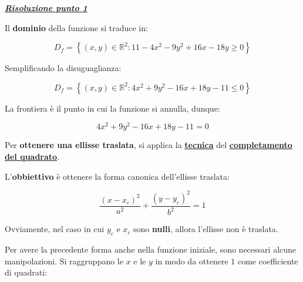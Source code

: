 \documentclass[a4paper]{article}
\begin{document}
	\noindent
	\textcolor{Green4}{\textbf{\underline{\emph{Risoluzione punto 1}}}}\newline

	\noindent
	Il \textbf{dominio} della funzione si traduce in:
	
	\begin{equation*}
		D_{f} = \left\{\left(x,y\right) \in \mathbb{R}^{2} : 11 - 4x^{2} - 9y^{2} + 16x - 18y \ge 0\right\}
	\end{equation*}

	\noindent
	Semplificando la disuguaglianza:
	
	\begin{equation*}
		D_{f} = \left\{\left(x,y\right) \in \mathbb{R}^{2} : 4x^{2} + 9y^{2} - 16x +18y - 11 \le 0\right\}
	\end{equation*}

	\noindent
	La frontiera è il punto in cui la funzione si annulla, dunque:
	
	\begin{equation*}
		4x^{2} + 9y^{2} - 16x +18y - 11 = 0
	\end{equation*}
	
	\noindent
	Per \textbf{ottenere una ellisse traslata}, si applica la \textcolor{Red3}{\textbf{\underline{tecnica}}} del \textcolor{Red3}{\textbf{\underline{completamento del quadrato}}}.\newline
	
	\noindent
	L'\textbf{obbiettivo} è ottenere la forma canonica dell'ellisse traslata:
	
	\begin{equation*}
		\dfrac{\left(x - x_{c}\right)^{2}}{a^{2}} + \dfrac{\left(y - y_{c}\right)^{2}}{b^{2}} = 1
	\end{equation*}

	\noindent
	Ovviamente, nel caso in cui $y_{c}$ e $x_{c}$ sono \textbf{nulli}, allora l'ellisse non è traslata.\newline
	
	\noindent
	Per avere la precedente forma anche nella funzione iniziale, sono necessari alcune manipolazioni. Si raggruppano le $x$ e le $y$ in modo da ottenere $1$ come coefficiente di quadrati:
	
\end{document}
